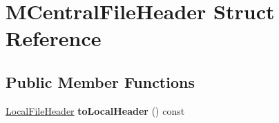 \hypertarget{struct_m_central_file_header}{}\section{M\+Central\+File\+Header Struct Reference}
\label{struct_m_central_file_header}
\subsection*{Public Member Functions}
\begin{DoxyCompactItemize}
\item 
\mbox{\label{struct_m_central_file_header_a83d8a899bf9fb29605afb58c3f26703f}} 
\hyperlink{struct_local_file_header}{Local\+File\+Header} {\bfseries to\+Local\+Header} () const
\end{DoxyCompactItemize}
